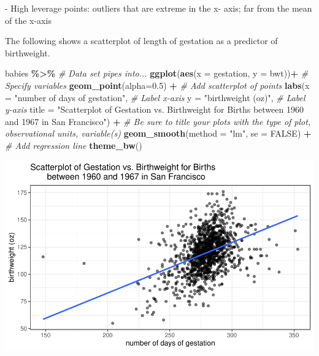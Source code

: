\documentclass[
]{report}
\newenvironment{Shaded}{\begin{snugshade}}{\end{snugshade}}
\newcommand{\AttributeTok}[1]{\textcolor[rgb]{0.13,0.29,0.53}{#1}}
\newcommand{\CommentTok}[1]{\textcolor[rgb]{0.56,0.35,0.01}{\textit{#1}}}
\newcommand{\ConstantTok}[1]{\textcolor[rgb]{0.56,0.35,0.01}{#1}}
\newcommand{\FloatTok}[1]{\textcolor[rgb]{0.00,0.00,0.81}{#1}}
\newcommand{\FunctionTok}[1]{\textcolor[rgb]{0.13,0.29,0.53}{\textbf{#1}}}
\newcommand{\NormalTok}[1]{#1}
\newcommand{\SpecialCharTok}[1]{\textcolor[rgb]{0.81,0.36,0.00}{\textbf{#1}}}
\newcommand{\StringTok}[1]{\textcolor[rgb]{0.31,0.60,0.02}{#1}}
\newcommand{\rgi}{\hspace{24pt}}  %
\begin{document}
\rgi \rgi - High leverage points: outliers that are extreme in the x- axis; far from the mean of the x-axis

The following shows a scatterplot of length of gestation as a predictor of birthweight.

\begin{Shaded}
\begin{Highlighting}[]
\NormalTok{babies }\SpecialCharTok{\%\textgreater{}\%} \CommentTok{\# Data set pipes into...}
\FunctionTok{ggplot}\NormalTok{(}\FunctionTok{aes}\NormalTok{(}\AttributeTok{x =}\NormalTok{ gestation, }\AttributeTok{y =}\NormalTok{ bwt))}\SpecialCharTok{+}  \CommentTok{\# Specify variables}
  \FunctionTok{geom\_point}\NormalTok{(}\AttributeTok{alpha=}\FloatTok{0.5}\NormalTok{) }\SpecialCharTok{+}  \CommentTok{\# Add scatterplot of points}
  \FunctionTok{labs}\NormalTok{(}\AttributeTok{x =} \StringTok{"number of days of gestation"}\NormalTok{,  }\CommentTok{\# Label x{-}axis}
       \AttributeTok{y =} \StringTok{"birthweight (oz)"}\NormalTok{,  }\CommentTok{\# Label y{-}axis}
       \AttributeTok{title =} \StringTok{"Scatterplot of Gestation vs. Birthweight for Births}
\StringTok{       between 1960 and 1967 in San Francisco"}\NormalTok{) }\SpecialCharTok{+} 
    \CommentTok{\# Be sure to title your plots with the type of plot, observational units, variable(s)}
  \FunctionTok{geom\_smooth}\NormalTok{(}\AttributeTok{method =} \StringTok{"lm"}\NormalTok{, }\AttributeTok{se =} \ConstantTok{FALSE}\NormalTok{) }\SpecialCharTok{+} \CommentTok{\# Add regression line}
    \FunctionTok{theme\_bw}\NormalTok{()}
\end{Highlighting}
\end{Shaded}

\begin{center}\includegraphics[width=0.8\linewidth]{13-VN13-regression_files/figure-latex/unnamed-chunk-2-1} \end{center}
\end{document}
